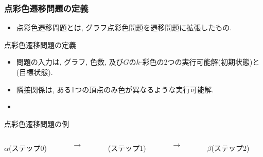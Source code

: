\documentclass[dvipdfmx,11pt]{beamer}
\begin{document}
\begin{frame}\frametitle{点彩色遷移問題の定義}
  \begin{itemize}
    \item \alert{点彩色遷移問題}とは, グラフ点彩色問題を遷移問題に拡張したもの.
  \end{itemize}

  \begin{block}{点彩色遷移問題の定義}
    \begin{itemize}
      \item 問題の入力は, グラフ, 色数, 及び$G$の$k$-彩色の2つの実行可能解\structure{$\alpha$}(初期状態)と\structure{$\beta$}(目標状態).
      \item 隣接関係は, ある1つの頂点のみ色が異なるような実行可能解.
      \item {}
    \end{itemize}
  \end{block}

  \begin{exampleblock}{点彩色遷移問題の例}
    \begin{columns}
      \begin{column}{0.3\textwidth}
        \centering
        
        $\alpha$(ステップ0)
      \end{column}
      \begin{column}{0.05\textwidth}
        \textbf{$\longrightarrow$}
      \end{column}
      \begin{column}[]{0.3\textwidth}
        \centering
        
        (ステップ1)
      \end{column}
      \begin{column}{0.05\textwidth}
        \textbf{$\longrightarrow$}
      \end{column}
      \begin{column}{0.3\textwidth}
        \centering
        
        $\beta$(ステップ2)
      \end{column}
    \end{columns}
  \end{exampleblock}
  
\end{frame}

\end{document}
